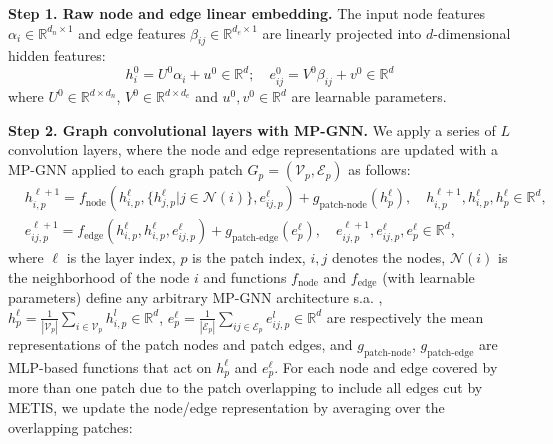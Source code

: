 \documentclass{article}
\begin{document}
\textbf{Step 1. Raw node and edge linear embedding.} The input node features $\alpha_i\in \mathbb{R}^{d_n \times 1} $ and edge features $\beta_{ij} \in \mathbb{R}^{d_e\times 1}$ are linearly projected into $d$-dimensional hidden features:
\begin{equation}
 h_i^0=U^0\alpha_i + u^0 \in\mathbb{R}^{d} ; \quad e_{ij}^0=V^0\beta_{ij}+v^0 \in\mathbb{R}^{d}
 \label{eq: input features}
\end{equation}
where $U^0 \in \mathbb{R}^{d\times d_n}$, $V^0\in\mathbb{R}^{d\times d_e}$ and $u^0, v^0\in \mathbb{R}^d$ are learnable parameters. 


\textbf{Step 2. Graph convolutional layers with MP-GNN.} We apply a series of $L$ convolution layers, where the node and edge representations are updated with a MP-GNN applied to each graph patch $G_p=(\mathcal{V}_p, \mathcal{E}_p)$ as follows:
\begin{equation}
    \begin{split}
        &h_{i,p}^{\ell+1} = f_\textrm{node}(h_{i,p}^\ell, \{h_{j,p}^\ell|{j\in\mathcal{N}(i)}\}, e_{ij,p}^\ell) + g_\textrm{patch-node}(h_p^\ell),
         \quad h_{i,p}^{\ell+1}, h_{i,p}^{\ell},h_p^\ell \in \mathbb{R}^d,\\
    &e_{ij, p}^{\ell+1}=f_\textrm{edge}(h_{i,p}^\ell, h_{i,p}^\ell, e_{ij, p}^{\ell}) + g_\textrm{patch-edge}(e_p^\ell),
    \quad e_{ij, p}^{\ell+1}, e_{ij, p}^{\ell},e_p^\ell \in \mathbb{R}^d,
    \end{split}
\end{equation}
where $\ell$ is the layer index, $p$ is the patch index, $i,j$ denotes the nodes, $\mathcal{N}(i)$ is the neighborhood of the node $i$ and functions $f_\textrm{node}$ and $f_\textrm{edge}$ (with learnable parameters) define any arbitrary MP-GNN architecture s.a. \citep{kipf2017semi,bresson2017gatedgcn,hu2019gine,dwivedi2021generalization}, $h_p^\ell=\frac{1}{|\mathcal{V}_p|}\sum_{i\in \mathcal{V}_p} h_{i, p}^{l}\in\mathbb{R}^{d}$, $e_p^\ell=\frac{1}{|\mathcal{E}_p|}\sum_{ij\in \mathcal{E}_p} e_{ij, p}^{l}\in\mathbb{R}^{d}$ are respectively the mean representations of the patch nodes and patch edges, and $g_\textrm{patch-node}$, $g_\textrm{patch-edge}$ are MLP-based functions that act on $h_p^\ell$ and $e_p^\ell$. 
For each node and edge covered by more than one  patch due to the patch overlapping to include all edges cut by METIS, we update the node/edge representation by averaging over the overlapping patches:
\end{document}
